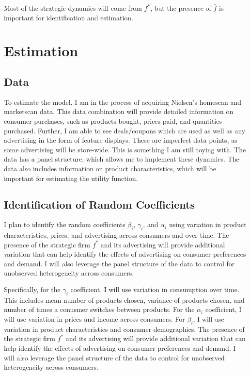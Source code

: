 \documentclass[12pt]{article}
\begin{document}
    Most of the strategic dynamics will come from $f^*$, but the presence of $\bar{f}$ is important for identification and estimation.

\section{Estimation}

    \subsection{Data}
    To estimate the model, I am in the process of acquiring Nielsen's homescan and marketscan data. This data combination will provide detailed information on consumer purchases, such as products bought, prices paid, and quantities purchased. Further, I am able to see deals/coupons which are used as well as any advertising in the form of feature displays. These are imperfect data points, as some advertising will be store-wide. This is something I am still toying with. The data has a panel structure, which allows me to implement these dynamics. The data also includes information on product characteristics, which will be important for estimating the utility function. 

    \subsection{Identification of Random Coefficients}

    I plan to identify the random coefficients $\beta_i$, $\gamma_i$, and $\alpha_i$ using variation in product characteristics, prices, and advertising across consumers and over time. The presence of the strategic firm $f^*$ and its advertising will provide additional variation that can help identify the effects of advertising on consumer preferences and demand. I will also leverage the panel structure of the data to control for unobserved heterogeneity across consumers.

    Specifically, for the $\gamma_i$ coefficient, I will use variation in consumption over time. This includes mean number of products chosen, variance of products chosen, and number of times a conusmer switches between products. For the $\alpha_i$ coefficient, I will use variation in prices and income across consumers. For $\beta_i$, I will use variation in product characteristics and consumer demographics. The presence of the strategic firm $f^*$ and its advertising will provide additional variation that can help identify the effects of advertising on consumer preferences and demand. I will also leverage the panel structure of the data to control for unobserved heterogeneity across consumers.
\end{document}
